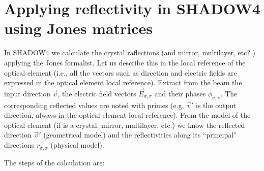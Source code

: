 \documentclass{iucr}
\begin{document}
\section{Applying reflectivity in SHADOW4 using Jones matrices }\label{sec:JonesInS4}

In SHADOW4 we calculate the crystal raflections (and mirror, multilayer, etc? ) applying the Jones formalist. Let us describe this in the local reference of the optical element (i.e., all the vectors such as direction and electric fields are expressed in the optical element local reference). Extract from the beam the input direction $\vec{v}$, the electric field vectors $\vec{E}_{\sigma,\pi}$ and their phases $\phi_{\sigma,\pi}$. The corresponding reflected values are noted with primes (e.g, $\vec{v}'$ is the output direction, always in the optical element local reference). From the model of the optical element (if is a crystal, mirror, multilayer, etc.) we know the reflected direction $\vec{v}'$ (geometrical model) and the reflectivities along its ``principal" directions $r_{\sigma,\pi}$ (physical model).

The steps of the calculation are:
\end{document}
